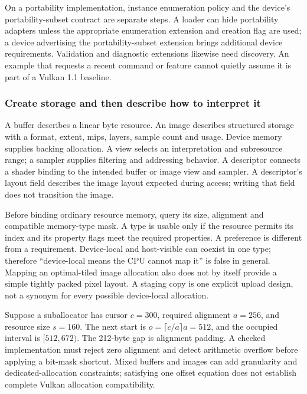 On a portability implementation, instance enumeration policy and the device's portability-subset contract are separate steps. A loader can hide portability adapters unless the appropriate enumeration extension and creation flag are used; a device advertising the portability-subset extension brings additional device requirements. Validation and diagnostic extensions likewise need discovery. An example that requests a recent command or feature cannot quietly assume it is part of a Vulkan 1.1 baseline.

\subsubsection{Create storage and then describe how to interpret it}\label{create-storage-and-then-describe-how-to-interpret-it}

A buffer describes a linear byte resource. An image describes structured storage with a format, extent, mips, layers, sample count and usage. Device memory supplies backing allocation. A view selects an interpretation and subresource range; a sampler supplies filtering and addressing behavior. A descriptor connects a shader binding to the intended buffer or image view and sampler. A descriptor's layout field describes the image layout expected during access; writing that field does not transition the image.

Before binding ordinary resource memory, query its size, alignment and compatible memory-type mask. A type is usable only if the resource permits its index and its property flags meet the required properties. A preference is different from a requirement. Device-local and host-visible can coexist in one type; therefore ``device-local means the CPU cannot map it'' is false in general. Mapping an optimal-tiled image allocation also does not by itself provide a simple tightly packed pixel layout. A staging copy is one explicit upload design, not a synonym for every possible device-local allocation.

Suppose a suballocator has cursor \(c=300\), required alignment \(a=256\), and resource size \(s=160\). The next start is \(o=\lceil c/a\rceil a=512\), and the occupied interval is \([512,672)\). The 212-byte gap is alignment padding. A checked implementation must reject zero alignment and detect arithmetic overflow before applying a bit-mask shortcut. Mixed buffers and images can add granularity and dedicated-allocation constraints; satisfying one offset equation does not establish complete Vulkan allocation compatibility.

